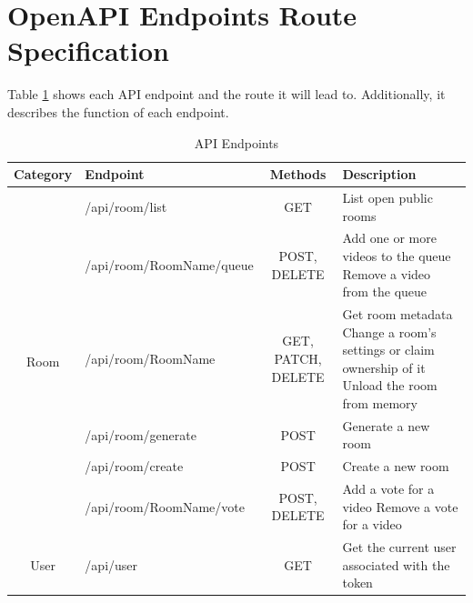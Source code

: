 \section{OpenAPI Endpoints Route Specification}

Table \ref{tbl:endpoints} shows each API endpoint and the route it will lead to. Additionally, it describes the function of each endpoint.


\begin{table}[htbp]
  \centering
  \caption{API Endpoints}
  \label{tbl:endpoints}
  \begin{tabular}{|c|l|c|p{5.5cm}|}
    \hline
    \textbf{Category}       & \textbf{Endpoint}               & \textbf{Methods}   & \textbf{Description}                                                                                              \\
    \hline
    \multirow{6}{*}{Room}   & /api/room/list                  & GET                & List open public rooms                                                                                            \\
    \cline{2-4}
                            & /api/room/{RoomName}/queue      & POST, DELETE       & Add one or more videos to the queue \newline Remove a video from the queue                                        \\
    \cline{2-4}
                            & /api/room/{RoomName}            & GET, PATCH, DELETE & Get room metadata \newline Change a room's settings or claim ownership of it \newline Unload the room from memory \\
    \cline{2-4}
                            & /api/room/generate              & POST               & Generate a new room                                                                                               \\
    \cline{2-4}
                            & /api/room/create                & POST               & Create a new room                                                                                                 \\
    \cline{2-4}
                            & /api/room/{RoomName}/vote       & POST, DELETE       & Add a vote for a video \newline Remove a vote for a video                                                         \\
    \hline
    \multirow{6}{*}{User}   & /api/user                       & GET                & Get the current user associated with the token                                                                    \\

\end{tabular}
\end{table}
